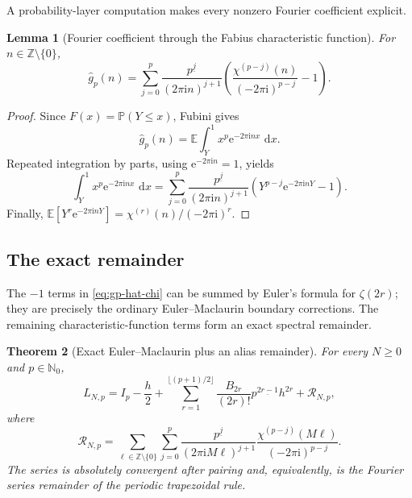 \documentclass[11pt,oneside]{article}
\numberwithin{equation}{section}
\newtheorem{theorem}{Theorem}[section]
\newtheorem{lemma}[theorem]{Lemma}
\theoremstyle{definition}
\theoremstyle{remark}
\newcommand{\N}{\mathbb N}
\newcommand{\Z}{\mathbb Z}
\newcommand{\E}{\mathbb E}
\newcommand{\Prob}{\mathbb P}
\newcommand{\dd}{\,\mathrm d}
\newcommand{\e}{\mathrm e}
\newcommand{\ii}{\mathrm i}
\newcommand{\fall}[2]{#1^{\underline{#2}}}
\newcommand{\defect}{\mathcal R}
\begin{document}
A probability-layer computation makes every nonzero Fourier coefficient explicit.

\begin{lemma}[Fourier coefficient through the Fabius characteristic function]
\label{lem:gp-hat}
For \(n\in\Z\setminus\{0\}\),
\begin{equation}
 \boxed{\displaystyle
 \widehat g_p(n)
 =\sum_{j=0}^{p}
 \frac{\fall p j}{(2\pi\ii n)^{j+1}}
 \left(
 \frac{\chi^{(p-j)}(n)}{(-2\pi\ii)^{p-j}}-1
 \right).}
 \label{eq:gp-hat-chi}
\end{equation}
\end{lemma}

\begin{proof}
Since \(F(x)=\Prob(Y\le x)\), Fubini gives
\begin{equation}
 \widehat g_p(n)=\E\int_Y^1x^p\e^{-2\pi\ii nx}\,\dd x.
 \label{eq:layer-fourier}
\end{equation}
Repeated integration by parts, using \(\e^{-2\pi\ii n}=1\), yields
\[
 \int_Y^1x^p\e^{-2\pi\ii nx}\,\dd x
 =\sum_{j=0}^{p}\frac{\fall p j}{(2\pi\ii n)^{j+1}}
 \left(Y^{p-j}\e^{-2\pi\ii nY}-1\right).
\]
Finally,
\(
 \E[Y^r\e^{-2\pi\ii nY}]=\chi^{(r)}(n)/(-2\pi\ii)^r
\).
\end{proof}

\subsection{The exact remainder}

The \(-1\) terms in \eqref{eq:gp-hat-chi} can be summed by Euler's formula for
\(\zeta(2r)\); they are precisely the ordinary Euler--Maclaurin boundary corrections.
The remaining characteristic-function terms form an exact spectral remainder.

\begin{theorem}[Exact Euler--Maclaurin plus an alias remainder]
\label{thm:EM-remainder}
For every \(N\ge0\) and \(p\in\N_0\),
\begin{equation}
 \boxed{\displaystyle
 L_{N,p}=I_p-\frac h2+
 \sum_{r=1}^{\lfloor(p+1)/2\rfloor}
 \frac{B_{2r}}{(2r)!}\fall p{2r-1}h^{2r}
 +\defect_{N,p},}
 \label{eq:EM-exact-remainder}
\end{equation}
where
\begin{equation}
 \boxed{\displaystyle
 \defect_{N,p}
 =\sum_{\ell\in\Z\setminus\{0\}}
 \sum_{j=0}^{p}
 \frac{\fall p j}{(2\pi\ii M\ell)^{j+1}}
 \frac{\chi^{(p-j)}(M\ell)}{(-2\pi\ii)^{p-j}}.}
 \label{eq:R-alias}
\end{equation}
The series is absolutely convergent after pairing and, equivalently, is the Fourier
series remainder of the periodic trapezoidal rule.
\end{theorem}
\end{document}
